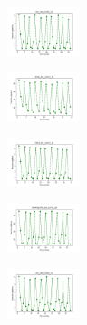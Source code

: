 \begin{figure}[H]
    \centering
    \begin{subfigure}
        \centering
        \includegraphics[width=0.234\textwidth]{img/ils-es/iris_set_const_10_949004259_cost.png}
    \end{subfigure}
    \hfill
    \begin{subfigure}
        \centering
        \includegraphics[width=0.234\textwidth]{img/ils-es/ecoli_set_const_10_949004259_cost.png}
    \end{subfigure}
    \hfill
    \begin{subfigure}
        \centering
        \includegraphics[width=0.234\textwidth]{img/ils-es/rand_set_const_10_949004259_cost.png}
    \end{subfigure}
    \hfill
    \begin{subfigure}
        \centering
        \includegraphics[width=0.234\textwidth]{img/ils-es/newthyroid_set_const_10_949004259_cost.png}
    \end{subfigure}
    \hfill
    \begin{subfigure}
        \centering
        \includegraphics[width=0.234\textwidth]{img/ils-es/iris_set_const_10_589741062_cost.png}
    \end{subfigure}
    \hfill

\end{figure}
